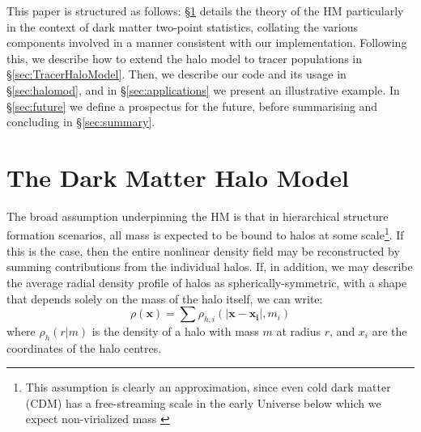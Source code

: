 \documentclass[5p]{elsarticle}
\begin{document}
This paper is structured as follows: \S\ref{sec:DMHaloModel} details the theory of the HM particularly in the context of dark matter two-point statistics, collating the various components involved in a manner consistent with our implementation. Following this, we describe how to extend the halo model to tracer populations in \S\ref{sec:TracerHaloModel}. Then, we describe our code and its usage in  \S\ref{sec:halomod}, and in \S\ref{sec:applications} we present an illustrative example. In \S\ref{sec:future} we define a prospectus for the future, before summarising and concluding in \S\ref{sec:summary}.


\section{The Dark Matter Halo Model}
\label{sec:DMHaloModel}
The broad assumption underpinning the HM is that in hierarchical structure formation scenarios, all mass is expected to be bound to halos at some scale\footnote{This assumption is clearly an approximation, since even cold dark matter (CDM) has a free-streaming scale in the early Universe below which we expect non-virialized mass \citep{Frenk2012,Schneider2014a}}. If this is the case, then the entire nonlinear density field may be reconstructed by summing contributions from the individual halos. If, in addition, we may describe the average radial density profile of halos as spherically-symmetric, with a shape that depends solely on the mass of the halo itself, we can write:
\begin{equation}
    \label{eq:hm_sum}
    \rho(\mathbf{x}) = \sum \rho_{h,i}(|\mathbf{x} - \mathbf{x_i}|,m_i)
\end{equation}
where $\rho_{h}(r|m)$ is the density of a halo with mass $m$ at radius $r$, and $x_i$ are the coordinates of the halo centres. 
\end{document}
